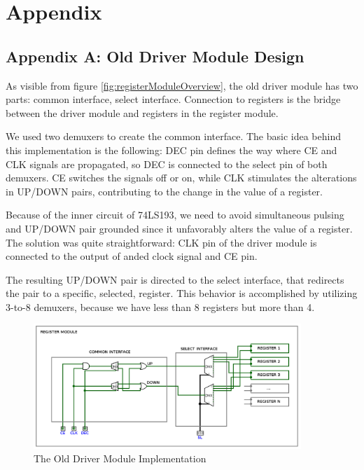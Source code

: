 \section{Appendix} \label{sec:appendix}
\subsection{Appendix A: Old Driver Module Design} \label{sec:appendix:old_driver_module_design}

As visible from figure \ref{fig:registerModuleOverview}, the old driver module has two parts: common interface, select interface. Connection to registers is the bridge between the driver module and registers in the register module.

We used two demuxers to create the common interface. The basic idea behind this implementation is the following: DEC pin defines the way where CE and CLK signals are propagated, so DEC is connected to the select pin of both demuxers. CE switches the signals off or on, while CLK stimulates the alterations in UP/DOWN pairs, contributing to the change in the value of a register. 

Because of the inner circuit of 74LS193, we need to avoid simultaneous pulsing and UP/DOWN pair grounded since it unfavorably alters the value of a register. The solution was quite straightforward: CLK pin of the driver module is connected to the output of anded clock signal and CE pin. 

The resulting UP/DOWN pair is directed to the select interface, that redirects the pair to a specific, selected, register. This behavior is accomplished by utilizing 3-to-8 demuxers, because we have less than 8 registers but more than 4.

\begin{figure}[H]
	\centering
	\includegraphics[width=0.9\textwidth]{img/driver_module_implementation}
	\caption{The Old Driver Module Implementation}
	\label{fig:driverModuleImplementation}
\end{figure}